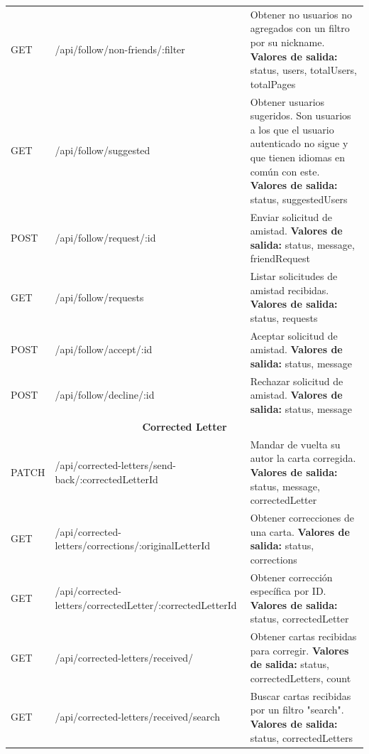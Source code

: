 \begin{longtable}{|l|p{5cm}|p{8cm}|}
GET & /api/follow/non-friends/:filter & Obtener no usuarios no agregados con un filtro por su nickname. \newline \textbf{Valores de salida:} status, users, totalUsers, totalPages \\
GET & /api/follow/suggested & Obtener usuarios sugeridos. Son usuarios a los que el usuario autenticado no sigue y que tienen idiomas en común con este. \newline \textbf{Valores de salida:} status, suggestedUsers \\
POST & /api/follow/request/:id & Enviar solicitud de amistad. \newline \textbf{Valores de salida:} status, message, friendRequest \\
GET & /api/follow/requests & Listar solicitudes de amistad recibidas. \newline \textbf{Valores de salida:} status, requests \\
POST & /api/follow/accept/:id & Aceptar solicitud de amistad. \newline \textbf{Valores de salida:} status, message \\
POST & /api/follow/decline/:id & Rechazar solicitud de amistad. \newline \textbf{Valores de salida:} status, message \\
\hline
\hline
\multicolumn{3}{|c|}{\textbf{Corrected Letter}} \\
\hline
PATCH & /api/corrected-letters/send-back/:corrected\-Letter\-Id & Mandar de vuelta su autor la carta corregida. \newline \textbf{Valores de salida:} status, message, correctedLetter \\
GET & /api/corrected-letters/corrections/:original\-Letter\-Id & Obtener correcciones de una carta. \newline \textbf{Valores de salida:} status, corrections \\
GET & /api/corrected-letters/corrected\-Letter/:corrected\-Letter\-Id & Obtener corrección específica por ID. \newline \textbf{Valores de salida:} status, correctedLetter \\
GET & /api/corrected-letters/received/ & Obtener cartas recibidas para corregir. \newline \textbf{Valores de salida:} status, correctedLetters, count \\
GET & /api/corrected-letters/received/search & Buscar cartas recibidas por un filtro "search". \newline \textbf{Valores de salida:} status, correctedLetters \\

\end{longtable}

